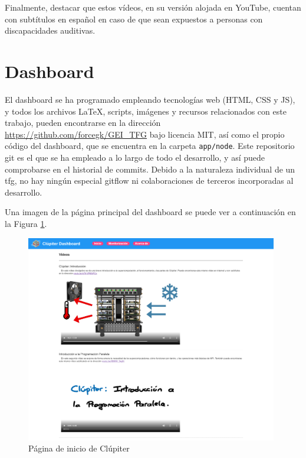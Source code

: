 Finalmente, destacar que estos vídeos, en su versión alojada en YouTube, cuentan con subtítulos en español en caso de que sean expuestos a personas con discapacidades auditivas.

\section{Dashboard}
El dashboard se ha programado empleando tecnologías web (HTML, CSS y JS), y todos los archivos \LaTeX, scripts, imágenes y recursos relacionados con este trabajo, pueden encontrarse en la dirección \url{https://github.com/forcegk/GEI_TFG} bajo licencia MIT, así como el propio código del dashboard, que se encuentra en la carpeta \texttt{app/node}. Este repositorio git es el que se ha empleado a lo largo de todo el desarrollo, y así puede comprobarse en el historial de commits. Debido a la naturaleza individual de un \acrshort{tfg}, no hay ningún especial gitflow ni colaboraciones de terceros incorporadas al desarrollo.

Una imagen de la página principal del dashboard se puede ver a continuación en la Figura \ref{fig:inicio_clupiter}.

\begin{figure}[h!]
  \centering
  \vspace{0.20cm}
  \includegraphics[width=0.98\textwidth]{img/dashboard/inicio.png}
  \caption{Página de inicio de Clúpiter}
  \label{fig:inicio_clupiter}
\end{figure}
